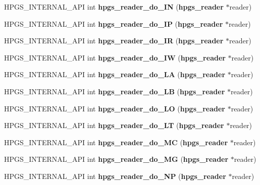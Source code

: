 \begin{CompactItemize}
\item 
HPGS\_\-INTERNAL\_\-API int \textbf{hpgs\_\-reader\_\-do\_\-IN} ({\bf hpgs\_\-reader} $\ast$reader)\label{group__reader_g90d43ae4088c31f4410741183d965473}

\item 
HPGS\_\-INTERNAL\_\-API int \textbf{hpgs\_\-reader\_\-do\_\-IP} ({\bf hpgs\_\-reader} $\ast$reader)\label{group__reader_gb6d0c05663530d5753aa01d5175fe812}

\item 
HPGS\_\-INTERNAL\_\-API int \textbf{hpgs\_\-reader\_\-do\_\-IR} ({\bf hpgs\_\-reader} $\ast$reader)\label{group__reader_g58b821f02eea2f09c87eae16d12a65cf}

\item 
HPGS\_\-INTERNAL\_\-API int \textbf{hpgs\_\-reader\_\-do\_\-IW} ({\bf hpgs\_\-reader} $\ast$reader)\label{group__reader_g7d959866078c4b03f7a59e12a23f4584}

\item 
HPGS\_\-INTERNAL\_\-API int \textbf{hpgs\_\-reader\_\-do\_\-LA} ({\bf hpgs\_\-reader} $\ast$reader)\label{group__reader_gc0dda452214e934618ee2c81006c0841}

\item 
HPGS\_\-INTERNAL\_\-API int \textbf{hpgs\_\-reader\_\-do\_\-LB} ({\bf hpgs\_\-reader} $\ast$reader)\label{group__reader_g7a3fa037ff8e75768e32bc8c6608c735}

\item 
HPGS\_\-INTERNAL\_\-API int \textbf{hpgs\_\-reader\_\-do\_\-LO} ({\bf hpgs\_\-reader} $\ast$reader)\label{group__reader_gf64432ba4e6d044698f624df106db95b}

\item 
HPGS\_\-INTERNAL\_\-API int \textbf{hpgs\_\-reader\_\-do\_\-LT} ({\bf hpgs\_\-reader} $\ast$reader)\label{group__reader_g82887bdfcf93658b4f7760cca796daf3}

\item 
HPGS\_\-INTERNAL\_\-API int \textbf{hpgs\_\-reader\_\-do\_\-MC} ({\bf hpgs\_\-reader} $\ast$reader)\label{group__reader_g1d5faab281e509d8f1ae6218e8e40667}

\item 
HPGS\_\-INTERNAL\_\-API int \textbf{hpgs\_\-reader\_\-do\_\-MG} ({\bf hpgs\_\-reader} $\ast$reader)\label{group__reader_g5e8e8febb5e02732d913ff5f4e1334c2}

\item 
HPGS\_\-INTERNAL\_\-API int \textbf{hpgs\_\-reader\_\-do\_\-NP} ({\bf hpgs\_\-reader} $\ast$reader)\label{group__reader_gfc2f2f2942ece9cdb6b78e77162ff769}


\end{CompactItemize}
